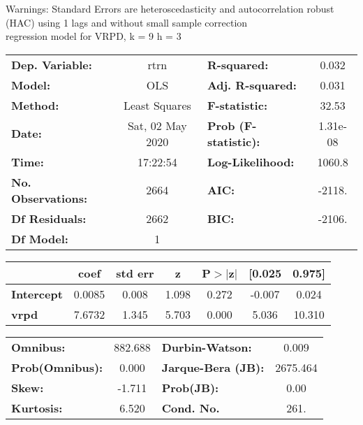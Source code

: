 Warnings: \newline
 [1] Standard Errors are heteroscedasticity and autocorrelation robust (HAC) using 1 lags and without small sample correction\\ 

regression model for VRPD, k = 9 h = 3\begin{center}
\begin{tabular}{lclc}
\toprule
\textbf{Dep. Variable:}    &       rtrn       & \textbf{  R-squared:         } &     0.032   \\
\textbf{Model:}            &       OLS        & \textbf{  Adj. R-squared:    } &     0.031   \\
\textbf{Method:}           &  Least Squares   & \textbf{  F-statistic:       } &     32.53   \\
\textbf{Date:}             & Sat, 02 May 2020 & \textbf{  Prob (F-statistic):} &  1.31e-08   \\
\textbf{Time:}             &     17:22:54     & \textbf{  Log-Likelihood:    } &    1060.8   \\
\textbf{No. Observations:} &        2664      & \textbf{  AIC:               } &    -2118.   \\
\textbf{Df Residuals:}     &        2662      & \textbf{  BIC:               } &    -2106.   \\
\textbf{Df Model:}         &           1      & \textbf{                     } &             \\
\bottomrule
\end{tabular}
\begin{tabular}{lcccccc}
                   & \textbf{coef} & \textbf{std err} & \textbf{z} & \textbf{P$> |$z$|$} & \textbf{[0.025} & \textbf{0.975]}  \\
\midrule
\textbf{Intercept} &       0.0085  &        0.008     &     1.098  &         0.272        &       -0.007    &        0.024     \\
\textbf{vrpd}      &       7.6732  &        1.345     &     5.703  &         0.000        &        5.036    &       10.310     \\
\bottomrule
\end{tabular}
\begin{tabular}{lclc}
\textbf{Omnibus:}       & 882.688 & \textbf{  Durbin-Watson:     } &    0.009  \\
\textbf{Prob(Omnibus):} &   0.000 & \textbf{  Jarque-Bera (JB):  } & 2675.464  \\
\textbf{Skew:}          &  -1.711 & \textbf{  Prob(JB):          } &     0.00  \\
\textbf{Kurtosis:}      &   6.520 & \textbf{  Cond. No.          } &     261.  \\
\bottomrule
\end{tabular}
\end{center}


